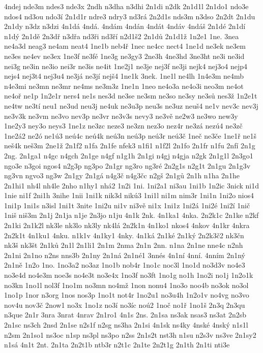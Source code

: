 {4ndej
nde3m
ndes3
nde3x
2ndh
n3dha
n3dhi
2n1di
n2dk
2n1d1l
2n1do1
ndo3e
ndos4
nd3ou
ndo3í
2n1d1r
ndre3
ndry3
nd3rá
2n2d1s
nds3m
n3dso
2n2dt
2n1du
2n1dy
n3dz
n3dzi
4n1dá
4ndá.
4ndám
4ndán
4ndát
4ndáv
4ndáš
2n1dé
2n1dí
n1dý
2n1dě
2n3dř
n3dřa
nd3ři
nd3ří
n2d1š2
2n1dů
2n1d1ž
1n2e1
1ne.
3nea
ne4a3d
neag3
ne4am
neat4
1ne1b
neb4ř
1nec
ne4cc
nect4
1ne1d
ne3ek
ne3em
ne3es
ne4ev
ne3ex
1ne3f
ne3fé
1ne3g
ne3gy3
2ne3h
4ne3hd
3ne3ht
ne3i
ne3id
nei3g
ne3in
ne3io
nei3r
ne3is
ne4it
1ne2j1
ne3je
nej3f
ne3ji
nejk4
nej3o4
nejp4
nejs4
nej3t4
nej3u4
ne3já
ne3jí
nejš4
1ne1k
3nek.
1ne1l
ne4lh
1n4e3m
ne4mb
n4e3mi
ne3mn
ne3mr
ne4ms
ne3m3z
1ne1n
1neo
ne4o3a
ne4o3i
neo3m
ne4ot
ne4oř
ne1p
1n2e1r
ners4
ne1s
nes3d
ne3se
ne3sm
ne3so
ne3sy
ne3sů
nes3ž
1n2e1t
ne4tw
ne3tí
neu1
ne3ud
neu3j
ne4uk
ne3u3p
neu3s
ne3uz
neuš4
ne1v
nev3c
nev3j
ne3v3k
ne3vm
ne3vo
nev3p
ne3vr
ne3v3s
nevy3
ne3vě
ne2w3
ne3wo
new3y
1ne2y3
ney3o
neys3
1ne1z
ne3zc
neze3
ne3zn
nez3o
nez4r
ne3zá
nezú4
ne3zč
1ne2á2
ne2ó
ne1ú3
neú4c
neú4k
neú3n
neú3p
neú3r
neú3č
1neč
ne3če
1ne1ř
ne1š
neš4k
neš3m
2ne1ž
2n1f2
n1fa
2n1fe
nfek3
n1fi1
n1f2l
2n1fo
2n1fr
n1fu
2nfí
2n1g
2ng.
2n1ga1
n4gc
n4gch
2n1ge
n4gf
n1g1h
2n1gi
n4gj
n4gja
n2gk
2n1g1l
2n3go1
ngo3e
n3goi
ngos4
n2g3p
ng3po
2n1gr
ng3ro
ng3ré
2n2g1s
n2g1t
2n1gu
2n1g3v
ng3vn
ngvo3
ng3w
2n1gy
2n1gá
n4g3č
n4g3čc
n2gš
2n1gů
2n1h
n1ha
2n1he
2n1hi1
nh4l
nh4le
2nho
n1hy1
nhá2
1n2i
1ni.
1ni2a1
ni3au
1ni1b
1n2ic
3nick
ni1d
1nie
ni1f
2ni1h
3nihe
1nii
1ni1k
nik3d
nikú3
1ni1l
ni1m
nim3r
1ni1n
1ni2o
nios4
1ni1p
1ni1s
n3isl
1ni1t
3nite
1ni2u
ni1v
ni3vě
ni1x
1ni1z
1ni2á
1ni2é
1ni2í
1nič
1niš
niš3m
2n1j
2n1ja
n1je
2n3jo
n1ju
4n1k
2nk.
4n1ka1
4nka.
2n2k1c
2n1ke
n2kf
2n1ki
2n1k2l
nk3le
nk3lo
nk3ly
nk4lá
2n2k1n
4n1ko1
nkos4
4nkov
4n1kr
4nkra
2n2k1t
4n1ku1
4nku.
n1k1v
4n1ky1
4nky.
4n1ká
2n1ké
2n1ký
2n2k3č2
nk3čn
nk3š
nk3št
2n1ků
2n1l
2n1li1
2n1m
2nma
2n1n
2nn.
n1na
2n1ne
nne4c
n2nh
2n1ni
2n1no
n2ns
nns3b
2n1ny
2n1ná
2n1né1
3nnés
4n1ní
4nní.
4nním
2n1ný
2n1ně
1n2o
1no.
1no3a2
no3az
1no1b
nob4r
1no1c
noc3l
1no1d
no3d3v
no4e3
no3e4d
no4e3m
noe3s
no4e3t
no3e4x
1no3f
no3ft
1no1g
no1h
1no2i
no1j
1n2o1k
no3kn
1no1l
nol3f
1no1m
no3mn
no4mž
1non
nonu4
1no3o
noo4b
no3ok
no3ol
1no1p
1nor
n3org
1nos
nos3p
1no1t
not4r
1no2u1
no3u4h
1n2o1v
no4vg
no3vo
nov4u
nov3č
2now1
no3x
1no1z
no3í
no3íc
noú2
1noč
no1ř
1no1š
2n3q
2n3qu
n3que
2n1r
3nra
3nrat
4nrav
2n1ro1
4n1s
2ns.
2n1sa
ns3ak
nsas3
ns3at
2n2sb
2n1sc
ns3ch
2nsd
2n1se
n2s1f
n2sg
ns3ha
2n1si
4n1sk
ns4ky
4nské
4nský
n1s1l
n2sm
2n1so1
ns3oc
n1sp
ns3pl
ns3po
n2ss
2n1s2t
nst3h
n1su
n2s3v
ns3ve
2n1sy2
n1sá
4n1t
2nt.
2n1ta
2n2t1b
ntb3r
n2t1c
2n1te
2n2t1g
2n1th
2n1ti
nti3e
}
